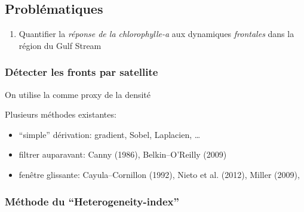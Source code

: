 
\subsection{Problématiques}

\begin{frame}
  \vspace{2em}

  \begin{enumerate}
    \setlength{\itemsep}{1em}
    \item Quantifier la \emph{réponse de la chlorophylle-a} aux dynamiques \emph{frontales} dans la région du Gulf Stream
  \end{enumerate}
\end{frame}


\begin{frame}
  \frametitle{Détecter les fronts par satellite}

  \begin{block}{}
    On utilise la  comme proxy de la densité
  \end{block}

  \begin{block}{}
    Plusieurs méthodes existantes:
    \begin{itemize}
            \setlength{\itemsep}{1.2em}
      \item “simple” dérivation: gradient, Sobel, Laplacien, \dots
      \item filtrer auparavant: Canny (1986), Belkin--O'Reilly (2009)
      \item fenêtre glissante: Cayula--Cornillon (1992), Nieto et al. (2012), Miller (2009), 
    \end{itemize}
  \end{block}
\end{frame}


\begin{frame}
  \frametitle{Méthode du “Heterogeneity-index”}
  \\[1em]

\end{frame}

